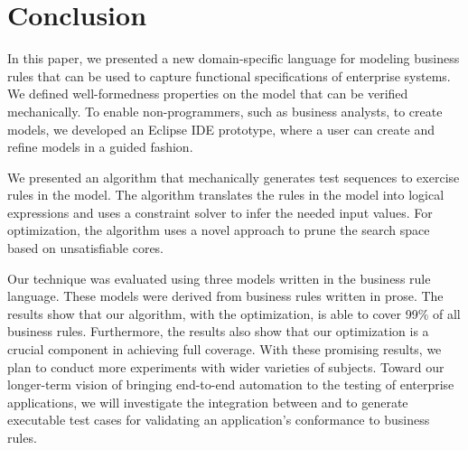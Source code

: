 \section{Conclusion}

In this paper, we presented a new domain-specific language for modeling business
rules that can be used to capture functional specifications of enterprise
systems. We defined well-formedness properties on the model that can be verified
mechanically. To enable non-prog\-rammers, such as business analysts, to create
models, we developed an Eclipse IDE prototype, where a user can create and
refine models in a guided fashion.

We presented an algorithm that mechanically generates test sequences to
exercise rules in the model. The algorithm translates the rules in the
model into logical expressions and uses a constraint solver to infer
the needed input values. For optimization, the algorithm uses a novel
approach to prune the search space based on unsatisfiable cores. 

Our technique was evaluated using three models written in the business
rule language. These models were derived from business rules written
in prose. The results show that our algorithm, with the optimization,
is able to cover 99\% of all business rules. Furthermore, the results
also show that our optimization is a crucial component in achieving
full coverage. With these promising results, we plan to conduct more
experiments with wider varieties of subjects. Toward our longer-term
vision of bringing end-to-end automation to the testing of enterprise
applications, we will investigate the integration between \tool{} and
\wateg{} to generate executable test cases for validating an
application's conformance to business rules.

